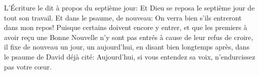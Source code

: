 L’Écriture le dit à propos du septième jour:
	Et Dieu se reposa le septième jour de tout son travail.
Et dans le psaume, de nouveau:
	On verra bien s’ils entreront dans mon repos!
Puisque certains doivent encore y entrer,
	et que les premiers à avoir reçu une Bonne Nouvelle
		n’y sont pas entrés à cause de leur refus de croire,
	il fixe de nouveau un jour, un aujourd’hui,
	en disant bien longtemps après, dans le psaume de David déjà cité:
	Aujourd’hui, si vous entendez sa voix, n’endurcissez pas votre cœur.

